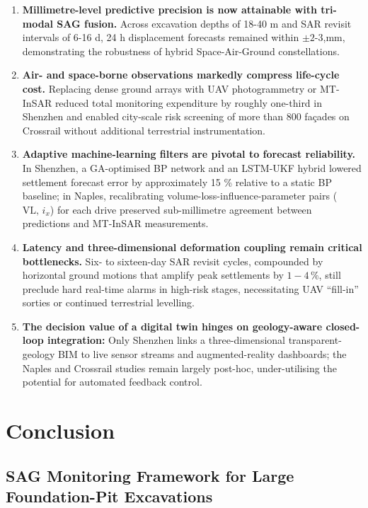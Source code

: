 \documentclass[preprint,11pt,authoryear,3p]{elsarticle}
\begin{document}
\begin{enumerate}
  \item \textbf{Millimetre-level predictive precision is now attainable with tri-modal SAG fusion.}  Across excavation depths of 18-40 m and SAR revisit intervals of 6-16 d, 24 h displacement forecasts remained within \(\pm\!2\text{-}3\),mm, demonstrating the robustness of hybrid Space-Air-Ground constellations.

  \item \textbf{Air- and space-borne observations markedly compress life-cycle cost.}  Replacing dense ground arrays with UAV photogrammetry or MT-InSAR reduced total monitoring expenditure by roughly one-third in Shenzhen and enabled city-scale risk screening of more than 800 façades on Crossrail without additional terrestrial instrumentation.

  \item \textbf{Adaptive machine-learning filters are pivotal to forecast reliability.}  In Shenzhen, a GA-optimised BP network and an LSTM-UKF hybrid lowered settlement forecast error by approximately 15 \% relative to a static BP baseline; in Naples, recalibrating volume-loss-influence-parameter pairs ($\mathrm{VL},\,i_x$) for each drive preserved sub-millimetre agreement between predictions and MT-InSAR measurements.

  \item \textbf{Latency and three-dimensional deformation coupling remain critical bottlenecks.}  Six- to sixteen-day SAR revisit cycles, compounded by horizontal ground motions that amplify peak settlements by $1\!-\!4\,\%$, still preclude hard real-time alarms in high-risk stages, necessitating UAV “fill-in'' sorties or continued terrestrial levelling.

  \item \textbf{The decision value of a digital twin hinges on geology-aware closed-loop integration:} Only Shenzhen links a three-dimensional transparent-geology BIM to live sensor streams and augmented-reality dashboards; the Naples and Crossrail studies remain largely post-hoc, under-utilising the potential for automated feedback control.
\end{enumerate}

\section{Conclusion}

\subsection{SAG Monitoring Framework for Large Foundation-Pit Excavations}
\end{document}
